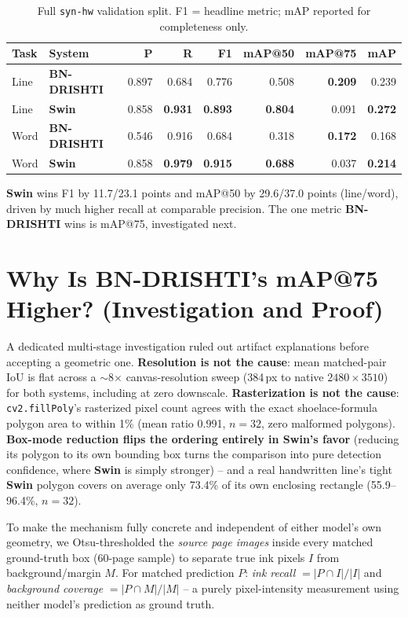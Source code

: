 \documentclass[10pt]{article}
\newcommand{\swin}{\textbf{Swin}}
\newcommand{\bnd}{\textbf{BN-DRISHTI}}
\begin{document}
\begin{table}[H]
\centering
\footnotesize
\caption{Full \texttt{syn-hw} validation split. F1 = headline metric; mAP reported for
completeness only.}
\begin{tabular}{@{}llrrrrrr@{}}
\toprule
Task & System & P & R & F1 & mAP@50 & mAP@75 & mAP \\
\midrule
Line & \bnd{}     & 0.897 & 0.684 & 0.776 & 0.508 & \textbf{0.209} & 0.239 \\
Line & \textbf{Swin} & 0.858 & \textbf{0.931} & \textbf{0.893} & \textbf{0.804} & 0.091 & \textbf{0.272} \\
Word & \bnd{}     & 0.546 & 0.916 & 0.684 & 0.318 & \textbf{0.172} & 0.168 \\
Word & \textbf{Swin} & 0.858 & \textbf{0.979} & \textbf{0.915} & \textbf{0.688} & 0.037 & \textbf{0.214} \\
\bottomrule
\end{tabular}
\end{table}

\swin{} wins F1 by 11.7/23.1 points and mAP@50 by 29.6/37.0 points (line/word), driven
by much higher recall at comparable precision. The one metric \bnd{} wins is mAP@75,
investigated next.

\section{Why Is BN-DRISHTI's mAP@75 Higher? (Investigation and Proof)}

A dedicated multi-stage investigation ruled out artifact explanations before accepting
a geometric one. \textbf{Resolution is not the cause}: mean matched-pair IoU is flat
across a $\sim$8$\times$ canvas-resolution sweep (384\,px to native $2480\times3510$)
for both systems, including at zero downscale. \textbf{Rasterization is not the
cause}: \texttt{cv2.fillPoly}'s rasterized pixel count agrees with the exact
shoelace-formula polygon area to within 1\% (mean ratio 0.991, $n=32$, zero malformed
polygons). \textbf{Box-mode reduction flips the ordering entirely in \swin's favor}
(reducing its polygon to its own bounding box turns the comparison into pure detection
confidence, where \swin{} is simply stronger) -- and a real handwritten line's tight
\swin{} polygon covers on average only 73.4\% of its own enclosing rectangle
(55.9--96.4\%, $n=32$).

To make the mechanism fully concrete and independent of either model's own geometry,
we Otsu-thresholded \cite{otsu1979threshold} the \emph{source page images} inside
every matched ground-truth box (60-page sample) to separate true ink pixels $I$ from
background/margin $M$. For matched prediction $P$: \emph{ink recall} $=|P\cap I|/|I|$
and \emph{background coverage} $=|P\cap M|/|M|$ -- a purely pixel-intensity measurement
using neither model's prediction as ground truth.
\end{document}
